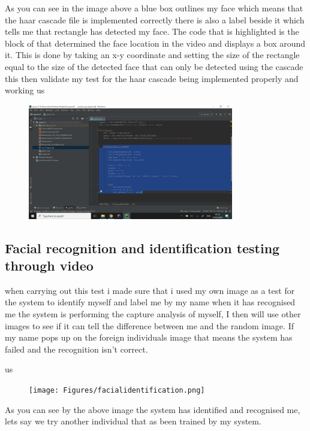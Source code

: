 As you can see in the image above a blue box outlines my face which means that the haar cascade file is implemented correctly there is also a label beside it which tells me that rectangle has detected my face. The code that is highlighted is the block of that determined the face location in the video and displays a box around it. This is done by taking an x-y coordinate and setting the size of the rectangle equal to the size of the detected face that can only be detected using the cascade this then validate my test for the haar cascade being implemented properly and working 
us\begin{figure}[h]
\includegraphics[width=0.8\textwidth]{Figures/facescript.png}
\end{figure}

\subsection{  Facial recognition and identification testing through video   }

when carrying out this test i made sure that i used my own image as a test for the system to identify myself and label me by my name when it has recognised me the system is performing the capture analysis of myself, I then will use other images to see if it can tell the difference between me and the random image. If my name pops up on the foreign individuals image that means the system has failed and the recognition isn't correct.

us\begin{figure}[h]
\texttt{[image: Figures/facialidentification.png]}
\end{figure}

As you can see by the above image the system has identified and recognised me, lets say we try another individual that as been trained by my system.


















